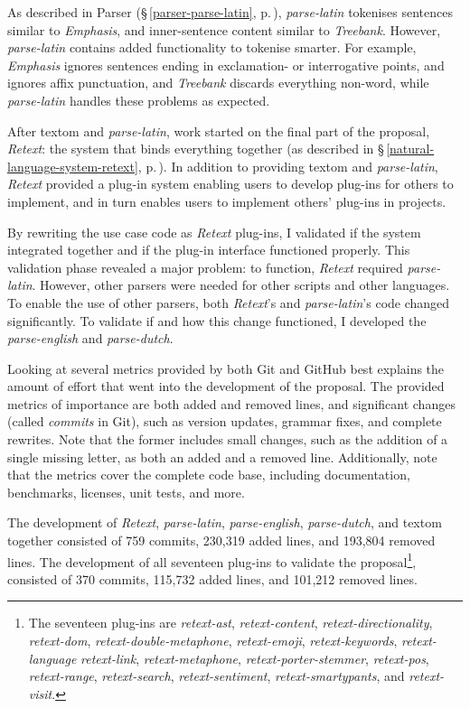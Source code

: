 As described in Parser (§\,\ref{parser-parse-latin},
  p.\,\pageref{parser-parse-latin}), \emph{parse-latin} tokenises sentences
  similar to \emph{Emphasis}, and inner-sentence content similar to
  \emph{Treebank}.
However, \emph{parse-latin} contains added functionality to tokenise smarter.
For example, \emph{Emphasis} ignores sentences ending in exclamation- or
  interrogative points, and ignores affix punctuation, and \emph{Treebank}
  discards everything non-word, while \emph{parse-latin} handles these
  problems as expected.

After \gls{textom} and \emph{parse-latin}, work started on the final
  part of the proposal, \emph{Retext}: the system that binds everything
  together (as described in §\,\ref{natural-language-system-retext},
  p.\,\pageref{natural-language-system-retext}).
In addition to providing \gls{textom} and \emph{parse-latin}, \emph{Retext}
  provided a plug-in system enabling users to develop plug-ins for others
  to implement, and in turn enables users to implement others' plug-ins
  in projects.

By rewriting the use case code as \emph{Retext} plug-ins, I validated if
  the system integrated together and if the plug-in interface functioned
  properly.
This validation phase revealed a major problem: to function, \emph{Retext}
  required \emph{parse-latin}.
However, other parsers were needed for other scripts and other languages.
To enable the use of other parsers, both \emph{Retext}'s and
  \emph{parse-latin}'s code changed significantly.
To validate if and how this change functioned, I developed the
  \emph{parse-english} and \emph{parse-dutch}.

\medskip\noindent Looking at several metrics provided by both Git and
  GitHub best explains the amount of effort that went into the development
  of the proposal.
The provided metrics of importance are both added and removed lines, and
  significant changes (called \emph{commits} in Git), such as version
  updates, grammar fixes, and complete rewrites.
Note that the former includes small changes, such as the addition of a single
  missing letter, as both an added and a removed line.
Additionally, note that the metrics cover the complete code base, including
  documentation, benchmarks, licenses, unit tests, and more.

The development of \emph{Retext}, \emph{parse-latin}, \emph{parse-english},
  \emph{parse-dutch}, and \gls{textom} together consisted of 759 commits,
  230,319 added lines, and 193,804 removed lines.
The development of all seventeen plug-ins to validate the
  proposal\footnote{The seventeen plug-ins are \emph{retext-ast},
    \emph{retext-content},
    \emph{retext-directionality}, \emph{retext-dom},
    \emph{retext-double-metaphone}, \emph{retext-emoji},
    \emph{retext-keywords}, \emph{retext-language}
    \emph{retext-link}, \emph{retext-metaphone},
    \emph{retext-porter-stemmer}, \emph{retext-pos}, \emph{retext-range},
    \emph{retext-search}, \emph{retext-sentiment}, \emph{retext-smartypants},
    and \emph{retext-visit}.},
  consisted of 370 commits, 115,732 added lines, and 101,212 removed lines.

